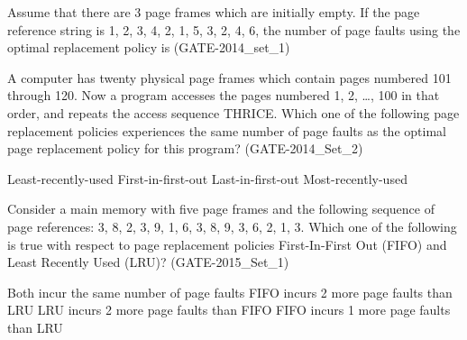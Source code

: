 
\begin{questyle}

  \question Assume that there are 3 page frames which are initially empty. If the page reference
            string is 1, 2, 3, 4, 2, 1, 5, 3, 2, 4, 6, the number of page faults using the optimal
            replacement policy is (GATE-2014\_set\_1)

\end{questyle}



\begin{questyle}

  \question  A computer has twenty physical page frames which contain pages numbered 101 through 120.
            Now a program accesses the pages numbered 1, 2, …, 100 in that order, and repeats the access sequence
            THRICE. Which one of the following page replacement policies experiences the same number of
            page faults as the optimal page replacement policy for this program? (GATE-2014\_Set\_2)

  \begin{choices}
    \choice Least-recently-used
    \choice First-in-first-out
    \choice Last-in-first-out
    \choice Most-recently-used
  \end{choices}

\end{questyle}


\begin{questyle}

  \question  Consider a main memory with five page frames and the following sequence of page
             references: 3, 8, 2, 3, 9, 1, 6, 3, 8, 9, 3, 6, 2, 1, 3. Which one of the following is true with respect
             to page replacement policies First-In-First Out (FIFO) and Least Recently Used (LRU)? (GATE-2015\_Set\_1)

  \begin{choices}
    \choice Both incur the same number of page faults
    \choice FIFO incurs 2 more page faults than LRU
    \choice LRU incurs 2 more page faults than FIFO
    \choice FIFO incurs 1 more page faults than LRU
  \end{choices}

\end{questyle}

